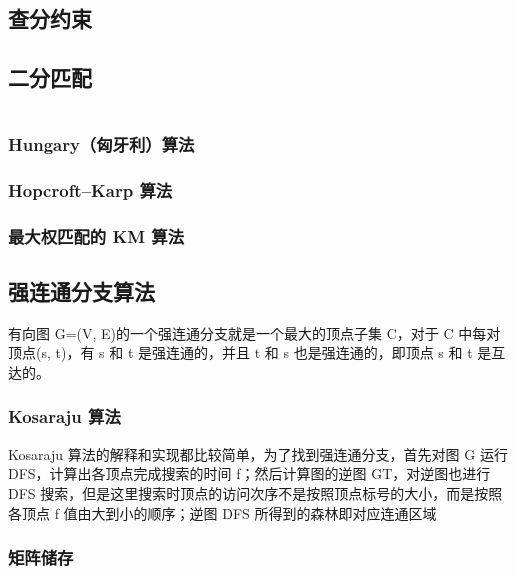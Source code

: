 \documentclass[a4paper]{article}
\begin{document}
\begin{CJK*}{UTF8}{gbsn}
\begin{multicols}{3}
\begin{flushleft}
\subsection{查分约束}


\subsection{二分匹配}
\begin{lstlisting}
\end{lstlisting}

\subsubsection{Hungary（匈牙利）算法}


\subsubsection{Hopcroft–Karp 算法}


\subsubsection{最大权匹配的 KM 算法}


\subsection{强连通分支算法}
有向图 G=(V, E)的一个强连通分支就是一个最大的顶点子集 C，对于 C 中每对顶点(s, t)，有 s 和 t 是强连通的，并且 t 和 s 也是强连通的，即顶点 s 和 t 是互达的。\\

\subsubsection{Kosaraju 算法}
Kosaraju 算法的解释和实现都比较简单，为了找到强连通分支，首先对图 G 运行 DFS，计算出各顶点完成搜索的时间 f；然后计算图的逆图 GT，对逆图也进行 DFS 搜索，但是这里搜索时顶点的访问次序不是按照顶点标号的大小，而是按照各顶点 f 值由大到小的顺序；逆图 DFS 所得到的森林即对应连通区域\\

\subsubsection{矩阵储存}




\end{flushleft}
\end{multicols}
\end{CJK*}
\end{document}
